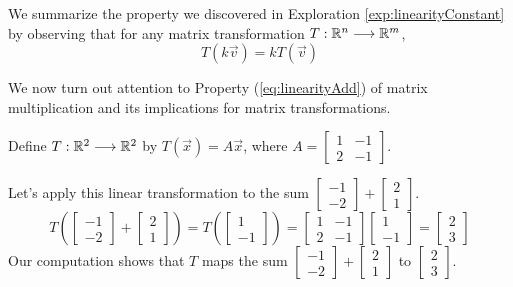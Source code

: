 \documentclass{ximera}
\begin{document}
We summarize the property we discovered in Exploration \ref{exp:linearityConstant} by observing that for any matrix transformation $T:\mathbb{R}^n\longrightarrow \mathbb{R}^m$, 
\begin{equation}\label{eq:linTransProp1}
T(k\vec{v})=kT(\vec{v})
\end{equation}

We now turn out attention to Property (\ref{eq:linearityAdd}) of matrix multiplication and its implications for matrix transformations.
\begin{exploration}\label{exp:linearityDist}
    Define $T:\mathbb{R}^2\longrightarrow\mathbb{R}^2$ by $T(\vec{x})=A\vec{x}$, where $A=\begin{bmatrix}1&-1\\2&-1\end{bmatrix}$.

Let's apply this linear transformation to the sum $\begin{bmatrix}-1\\-2\end{bmatrix}+\begin{bmatrix}2\\1\end{bmatrix}$.
\begin{equation*}\label{eq:linearitySum1}
T\left(\begin{bmatrix}-1\\-2\end{bmatrix}+\begin{bmatrix}2\\1\end{bmatrix}\right)=T\left(\begin{bmatrix}1\\-1\end{bmatrix}\right)=\begin{bmatrix}1&-1\\2&-1\end{bmatrix}\begin{bmatrix}1\\-1\end{bmatrix}=\begin{bmatrix}2\\3\end{bmatrix}
\end{equation*}
Our computation shows that $T$ maps the sum $\begin{bmatrix}-1\\-2\end{bmatrix}+\begin{bmatrix}2\\1\end{bmatrix}$ to $\begin{bmatrix}2\\3\end{bmatrix}$.


\end{exploration}
\end{document}
